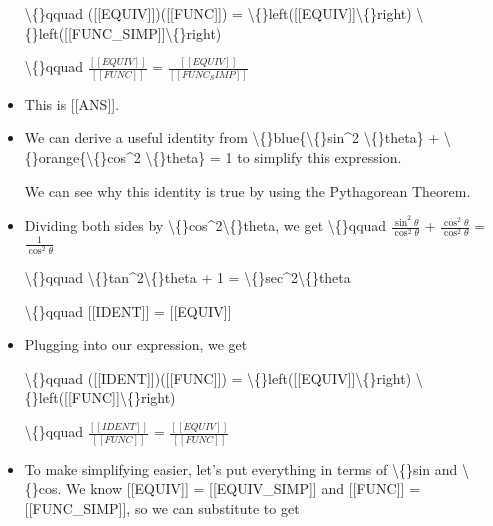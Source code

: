 \documentclass{article}
\begin{document}
\begin{itemize}
                        \textbackslash\{\}qquad
                            ([[EQUIV]])([[FUNC]])
                            =
                            \textbackslash\{\}left([[EQUIV]]\textbackslash\{\}right)
                            \textbackslash\{\}left([[FUNC\_SIMP]]\textbackslash\{\}right) 
                        
                    
                    
                        \textbackslash\{\}qquad
                            $\frac{[[EQUIV]]}{[[FUNC]]}$
                            =
                            $\frac{[[EQUIV]]}{[[FUNC_SIMP]]}$
  \item This is [[ANS]].
  \item We can derive a useful identity from 
                    \textbackslash\{\}blue\{\textbackslash\{\}sin\textasciicircum{}2 \textbackslash\{\}theta\} + \textbackslash\{\}orange\{\textbackslash\{\}cos\textasciicircum{}2 \textbackslash\{\}theta\}
                        = 1
                    to simplify this expression.
                    
                    We can see why this identity is true by using the 
                    Pythagorean Theorem.
  \item Dividing both sides by \textbackslash\{\}cos\textasciicircum{}2\textbackslash\{\}theta, we get
                    \textbackslash\{\}qquad $\frac{\sin^2\theta}{\cos^2\theta}$ 
                    + $\frac{\cos^2\theta}{\cos^2\theta}$ 
                    = $\frac{1}{\cos^2\theta}$
                    
                        \textbackslash\{\}qquad \textbackslash\{\}tan\textasciicircum{}2\textbackslash\{\}theta + 1 = \textbackslash\{\}sec\textasciicircum{}2\textbackslash\{\}theta
                    
                    \textbackslash\{\}qquad [[IDENT]] 
                        = [[EQUIV]]
  \item Plugging into our expression, we get
                    
                        \textbackslash\{\}qquad
                            ([[IDENT]])([[FUNC]])
                            =
                            \textbackslash\{\}left([[EQUIV]]\textbackslash\{\}right)
                            \textbackslash\{\}left([[FUNC]]\textbackslash\{\}right) 
                        
                    
                    
                        \textbackslash\{\}qquad
                            $\frac{[[IDENT]]}{[[FUNC]]}$
                            = 
                            $\frac{[[EQUIV]]}{[[FUNC]]}$
  \item To make simplifying easier, let's put everything
                    in terms of \textbackslash\{\}sin and \textbackslash\{\}cos.
                    We know [[EQUIV]] 
                        = [[EQUIV\_SIMP]]
                    and [[FUNC]] = [[FUNC\_SIMP]],
                    so we can substitute to get
                    

\end{itemize}
\end{document}
